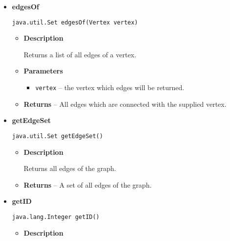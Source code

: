 {{{{{{{\begin{itemize}
{\begin{itemize}
{Adds the graph to a \texttt{\small FastGraphAccessor}{\small 
{}}.
}
\item{
{\bf  Parameters}
  \begin{itemize}
   \item{
\texttt{fga} -- the \texttt{\small FastGraphAccessor}{\small 
{}} to whom this graph will be added.}
  \end{itemize}
}%
\end{itemize}
}%
\item{ 
{\bf  edgesOf}\\
\begin{lstlisting}[frame=none]
java.util.Set edgesOf(Vertex vertex)\end{lstlisting} %
\begin{itemize}
\item{
{\bf  Description}

Returns a list of all edges of a vertex.
}
\item{
{\bf  Parameters}
  \begin{itemize}
   \item{
\texttt{vertex} -- the vertex which edges will be returned.}
  \end{itemize}
}%
\item{{\bf  Returns} -- 
All edges which are connected with the supplied vertex. 
}%
\end{itemize}
}%
\item{ 
{\bf  getEdgeSet}\\
\begin{lstlisting}[frame=none]
java.util.Set getEdgeSet()\end{lstlisting} %
\begin{itemize}
\item{
{\bf  Description}

Returns all edges of the graph.
}
\item{{\bf  Returns} -- 
A set of all edges of the graph. 
}%
\end{itemize}
}%
\item{ 
{\bf  getID}\\
\begin{lstlisting}[frame=none]
java.lang.Integer getID()\end{lstlisting} %
\begin{itemize}
\item{
{\bf  Description}

}
\end{itemize}}
\end{itemize}}}}}}}}
